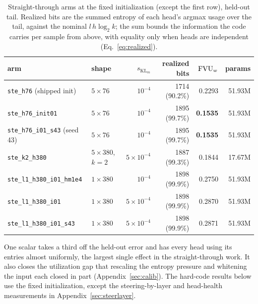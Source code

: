 \begin{table}[htbp]\centering\small
\begin{tabular}{@{}llrrrr@{}}
\toprule
arm & shape & $s_{\mathrm{KL}_m}$ & realized bits & $\mathrm{FVU}_w$ & params \\
\midrule
\texttt{ste\_h76} (shipped init)    & $5\times76$ & $10^{-4}$ & 1714 (90.2\%) & 0.2293 & 51.93M \\
\texttt{ste\_h76\_init01}            & $5\times76$ & $10^{-4}$ & 1895 (99.7\%) & \textbf{0.1535} & 51.93M \\
\texttt{ste\_h76\_i01\_s43} (seed 43) & $5\times76$ & $10^{-4}$ & 1895 (99.7\%) & \textbf{0.1535} & 51.93M \\
\texttt{ste\_k2\_h380}               & $5\times380$, $k{=}2$ & $5\times10^{-4}$ & 1887 (99.3\%) & 0.1844 & 17.67M \\
\texttt{ste\_l1\_h380\_i01\_hm1e4}   & $1\times380$ & $10^{-4}$ & 1898 (99.9\%) & 0.2750 & 51.93M \\
\texttt{ste\_l1\_h380\_i01}          & $1\times380$ & $5\times10^{-4}$ & 1898 (99.9\%) & 0.2870 & 51.93M \\
\texttt{ste\_l1\_h380\_i01\_s43}     & $1\times380$ & $5\times10^{-4}$ & 1898 (99.9\%) & 0.2871 & 51.93M \\
\bottomrule
\end{tabular}
\caption{Straight-through arms at the fixed initialization (except the
first row), held-out tail. Realized bits are the summed entropy of each
head's argmax usage over the tail, against the nominal $l\,h\log_2 k$; the
sum bounds the information the code carries per sample from above, with
equality only when heads are independent (Eq.~\eqref{eq:realized}).}
\label{tab:init}
\end{table}

One scalar takes a third off the held-out error and has every head using
its entries almost uniformly, the largest single effect in the
straight-through work. It also closes the utilization gap that rescaling
the entropy pressure and whitening the input each closed in part
(Appendix~\ref{sec:calib}). The hard-code results below use the fixed
initialization, except the steering-by-layer and head-health measurements
in Appendix~\ref{sec:steerlayer}.

